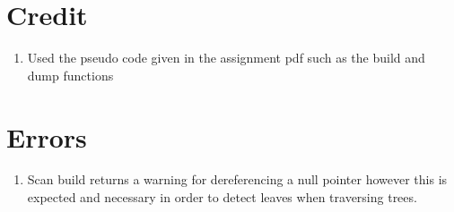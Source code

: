 \documentclass[11pt]{article}
\begin{document}
\section{Credit}
\begin{enumerate}
    \item Used the pseudo code given in the assignment pdf such as the build and dump 
    functions
\end{enumerate}

\section{Errors}
\begin{enumerate}
    \item Scan build returns a warning for dereferencing a null pointer however this is expected and necessary in order to detect leaves when traversing trees.
\end{enumerate}
\end{document}
